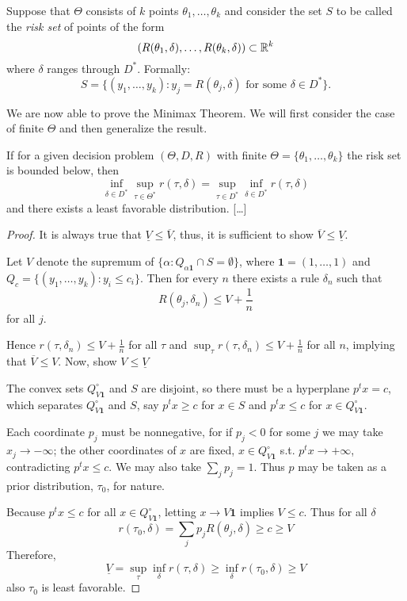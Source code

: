 \begin{definition}
Suppose that $\Theta$ consists of $k$ points $\theta_1,\dots,\theta_k$ and consider the set $S$ to be called the \emph{risk set} of points of the form 
\[
(R(\theta_1,\delta),\dots,R(\theta_k,\delta))\subset \mathbb{R}^k
\]
where $\delta$ ranges through $D^\ast$.
Formally:
\[
S=\{(y_1,\dots,y_k):y_j=R(\theta_j,\delta) \text{ for some }\delta\in D^\ast\}.
\]
\end{definition}

We are now able to prove the Minimax Theorem. We will first consider the case of finite $\Theta$ and then generalize the result.

\begin{theorem}\label{thm:minimax-finite}
	If for a given decision problem $(\Theta,D,R)$ with finite $\Theta=\{\theta_1,\dots,\theta_k\}$ the risk set is bounded below, then
	\[
	\inf_{\delta\in D^\ast}\sup_{\tau\in \Theta^\ast}r(\tau,\delta)=\sup_{\tau\in D^\ast}\inf_{\delta\in D^\ast} r(\tau,\delta)
	\]
	and there exists a least favorable distribution. [\dots]
\end{theorem}
\begin{proof}
	It is always true that $\underline{V}\leq \overline{V}$, thus, it is sufficient to show $\overline{V}\leq \underline{V}$.
	
	Let $V$ denote the supremum of $\{\alpha:Q_{\alpha\mathbf{1}}\cap S=\emptyset\}$, where $\mathbf{1}=(1,\dots,1)$ and $Q_c=\{(y_1,\dots,y_k)\colon y_i\leq c_i\}$. Then for every $n$ there exists a rule $\delta_n$ such that
	\[
	R(\theta_j,\delta_n)\leq V+\frac{1}{n}
	\]
	for all $j$.
	
	Hence $r(\tau,\delta_n)\leq V+\frac{1}{n}$ for all $\tau$ and $\sup_\tau r(\tau,\delta_n)\leq V+\frac{1}{n}$ for all $n$, implying that $\overline{V}\leq V$. Now, show $V\leq \underline{V}$
	
	The convex sets $Q_{V\mathbf{1}}^\circ$ and $S$ are disjoint, so there must be a hyperplane $p^tx=c$, which separates $Q_{V\mathbf{1}}^\circ$ and $S$, say $p^tx\geq c$ for $x\in S$ and $p^tx\leq c$ for $x\in Q_{V\mathbf{1}}^\circ$.
	
	Each coordinate $p_j$ must be nonnegative, for if $p_j<0$ for some $j$ we may take $x_j\to -\infty$; the other coordinates of $x$ are fixed, $x\in Q_{V\mathbf{1}}^\circ$ s.t. $p^tx\to +\infty$, contradicting $p^tx\leq c$. We may also take $\sum_j p_j=1$. Thus $p$ may be taken as a prior distribution, $\tau_0$, for nature.
	
	Because $p^tx\leq c$ for all $x\in Q_{V\mathbf{1}}^\circ$, letting $x\to V\mathbf{1}$ implies $V\leq c$. Thus for all $\delta$
	\[
	r(\tau_0,\delta)=\sum_j p_jR(\theta_j,\delta)\geq c\geq V
	\]
	Therefore,
	\[
	\underline{V}=\sup_\tau\inf_\delta r(\tau,\delta)\geq\inf_\delta r(\tau_0,\delta)\geq V
	\]
	also $\tau_0$ is least favorable.
\end{proof}

